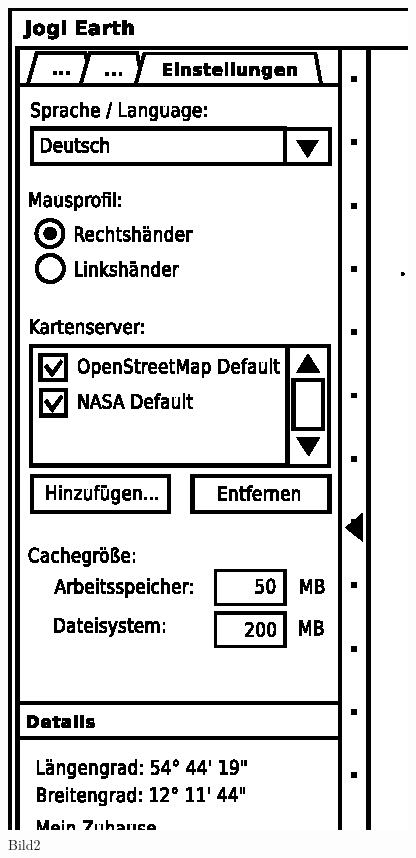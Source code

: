 \begin{figure}
\begin{minipage}[c]{5cm}
		\includegraphics[scale=0.9]{GUI-Einstellungen.eps}
	\end{minipage}
	\caption{Bild2}
	\label{Bild2}
\end{figure}